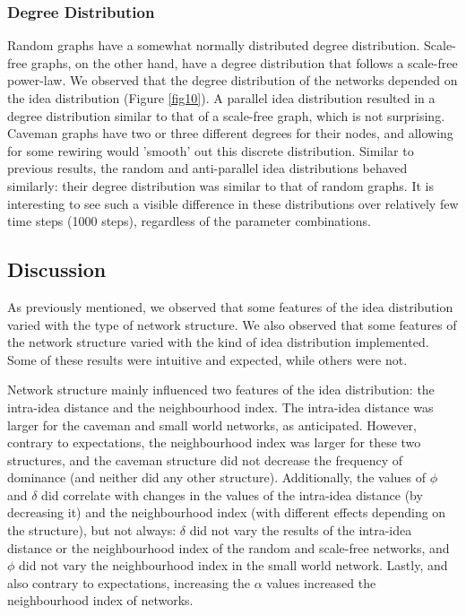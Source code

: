 \subsubsection{Degree Distribution}
Random graphs have a somewhat normally distributed degree distribution. Scale-free graphs, on the other hand, have a degree distribution that follows a scale-free power-law. We observed that the degree distribution of the networks depended on the idea distribution (Figure \ref{fig10}). A parallel idea distribution resulted in a degree distribution similar to that of a scale-free graph, which is not surprising. Caveman graphs have two or three different degrees for their nodes, and allowing for some rewiring would 'smooth' out this discrete distribution. Similar to previous results, the random and anti-parallel idea distributions behaved similarly: their degree distribution was similar to that of random graphs. It is interesting to see such a visible difference in these distributions over relatively few time steps (1000 steps), regardless of the parameter combinations. 


\subsection{Discussion}

As previously mentioned, we observed that some features of the idea distribution varied with the type of network structure. We also observed that some features of the network structure varied with the kind of idea distribution implemented. Some of these results were intuitive and expected, while others were not.

Network structure mainly influenced two features of the idea distribution: the intra-idea distance and the neighbourhood index. The intra-idea distance was larger for the caveman and small world networks, as anticipated. However, contrary to expectations, the neighbourhood index was larger for these two structures, and the caveman structure did not decrease the frequency of dominance (and neither did any other structure).  Additionally, the values of $\phi$ and $\delta$ did correlate with changes in the values of the intra-idea distance (by decreasing it) and the neighbourhood index (with different effects depending on the structure), but not always: $\delta$ did not vary the results of the intra-idea distance or the neighbourhood index of the random and scale-free networks, and $\phi$ did not vary the neighbourhood index in the small world network. Lastly, and also contrary to expectations, increasing the $\alpha$ values increased the neighbourhood index of networks.


